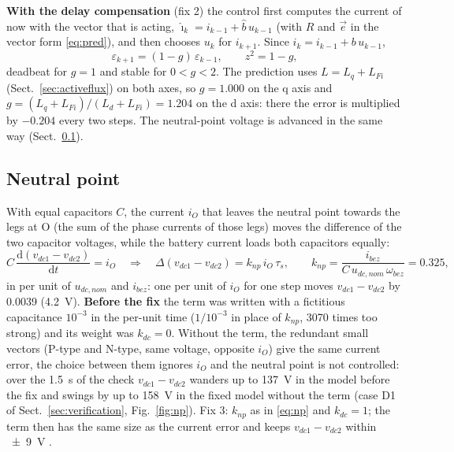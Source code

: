 \documentclass[10pt,a4paper]{scrartcl}
\newcommand{\tspu}{\tau_s}
\newcommand{\ib}{i_{bez}}
\newcommand{\wb}{\omega_{bez}}
\newcommand{\udcn}{u_{dc,nom}}
\begin{document}
\begin{onehalfspace}
\textbf{With the delay compensation} (fix 2) \cite{cortes2012} the control first computes the current of now with the vector that is acting, $\hat\imath_k = i_{k-1} + \hat b\,u_{k-1}$ (with $R$ and $\vec e$ in the vector form \eqref{eq:pred}), and then chooses $u_k$ for $i_{k+1}$. Since $i_k = i_{k-1} + b\,u_{k-1}$,
\begin{equation}
\varepsilon_{k+1} = (1 - g)\,\varepsilon_{k-1}, \qquad z^2 = 1 - g ,
\label{eq:comp}
\end{equation}
deadbeat for $g = 1$ and stable for $0 < g < 2$. The prediction uses $L = L_q + L_{Fi}$ (Sect.~\ref{sec:activeflux}) on both axes, so $g = 1.000$ on the q axis and $g = (L_q + L_{Fi})/(L_d + L_{Fi}) = 1.204$ on the d axis: there the error is multiplied by $-0.204$ every two steps. The neutral-point voltage is advanced in the same way (Sect.~\ref{sec:np}).

\subsection{Neutral point}
\label{sec:np}

With equal capacitors $C$, the current $i_O$ that leaves the neutral point towards the legs at O (the sum of the phase currents of those legs) moves the difference of the two capacitor voltages, while the battery current loads both capacitors equally:
\begin{equation}
C\,\frac{\mathrm{d}(v_{dc1} - v_{dc2})}{\mathrm{d}t} = i_O
\quad\Rightarrow\quad
\Delta(v_{dc1} - v_{dc2}) = k_{np}\, i_O\, \tspu, \qquad k_{np} = \frac{\ib}{C\,\udcn\,\wb} = 0.325,
\label{eq:np}
\end{equation}
in per unit of $\udcn$ and $\ib$: one per unit of $i_O$ for one step moves $v_{dc1} - v_{dc2}$ by 0.0039 (\SI{4.2}{V}). \textbf{Before the fix} the term was written with a fictitious capacitance $10^{-3}$ in the per-unit time ($1/10^{-3}$ in place of $k_{np}$, 3070 times too strong) and its weight was $k_{dc} = 0$. Without the term, the redundant small vectors (P-type and N-type, same voltage, opposite $i_O$) give the same current error, the choice between them ignores $i_O$ and the neutral point is not controlled: over the \SI{1.5}{s} of the check $v_{dc1} - v_{dc2}$ wanders up to \SI{137}{V} in the model before the fix and swings by up to \SI{158}{V} in the fixed model without the term (case D1 of Sect.~\ref{sec:verification}, Fig.~\ref{fig:np}). Fix 3: $k_{np}$ as in \eqref{eq:np} and $k_{dc} = 1$; the term then has the same size as the current error and keeps $v_{dc1} - v_{dc2}$ within \SI{\pm 9}{V} \cite{vargas2007}.


\end{onehalfspace}
\end{document}
